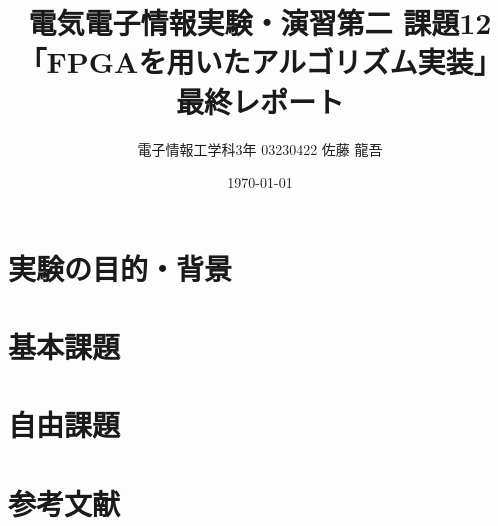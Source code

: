 \documentclass[dvipdfmx,10pt,a4paper,titlepage]{jsarticle}
\title{電気電子情報実験・演習第二 課題12\\「FPGAを用いたアルゴリズム実装」最終レポート}
\author{電子情報工学科3年 03230422 佐藤 龍吾}
\date{\today}
\begin{document}
\maketitle
\section{実験の目的・背景}

\section{基本課題}

\section{自由課題}

\section{参考文献}

\end{document}
